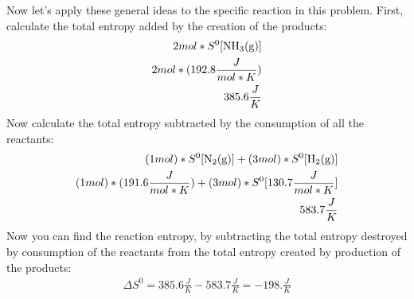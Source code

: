 \documentclass{article}  %
\begin{document}
Now let's apply these general ideas to the specific reaction in this problem.
First, calculate the total entropy added by the creation of the products:
\begin{equation*}
    \begin{aligned}
        2mol*S^0[\ce{NH3_(g)}] \\
        2mol*(192.8 \frac{J}{mol*K}) \\
        385.6 \frac{J}{K}
    \end{aligned}
\end{equation*}
Now calculate the total entropy subtracted by the consumption of all the reactants: 
\begin{equation*}
    \begin{aligned}
        (1mol) * S^0[\ce{N2_(g)}] + (3mol) * S^0[\ce{H2_(g)}] \\
        (1mol) * (191.6 \frac{J}{mol*K}) + (3mol) * S^0[130.7 \frac{J}{mol*K}] \\
        583.7 \frac{J}{K}
    \end{aligned}
\end{equation*}
Now you can find the reaction entropy, by subtracting the total entropy destroyed by consumption of the reactants from the total entropy created by production of the products: 
\begin{equation*}
    \begin{aligned}
        \Delta S^0 = 385.6 \frac{J}{K} - 583.7 \frac{J}{K} = -198. \frac{J}{K}
    \end{aligned}
\end{equation*}
\end{document}
